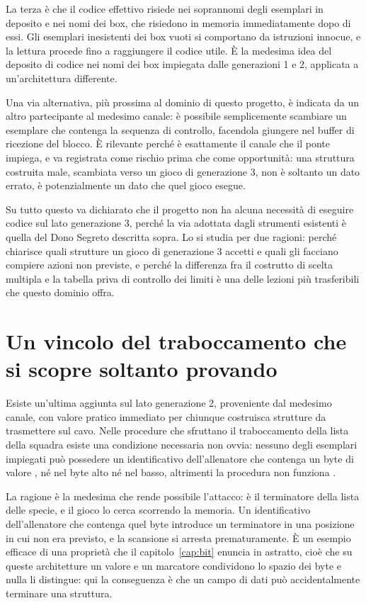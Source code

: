 La terza è che il codice effettivo risiede nei soprannomi degli esemplari in deposito e nei nomi dei box, che risiedono in memoria immediatamente dopo di essi. Gli esemplari inesistenti dei box vuoti si comportano da istruzioni innocue, e la lettura procede fino a raggiungere il codice utile. È la medesima idea del deposito di codice nei nomi dei box impiegata dalle generazioni 1 e 2, applicata a un'architettura differente.

Una via alternativa, più prossima al dominio di questo progetto, è indicata da un altro partecipante al medesimo canale: è possibile semplicemente scambiare un esemplare che contenga la sequenza di controllo, facendola giungere nel buffer di ricezione del blocco. È rilevante perché è esattamente il canale che il ponte impiega, e va registrata come rischio prima che come opportunità: una struttura costruita male, scambiata verso un gioco di generazione 3, non è soltanto un dato errato, è potenzialmente un dato che quel gioco esegue.

Su tutto questo va dichiarato che il progetto non ha alcuna necessità di eseguire codice sul lato generazione 3, perché la via adottata dagli strumenti esistenti è quella del Dono Segreto descritta sopra. Lo si studia per due ragioni: perché chiarisce quali strutture un gioco di generazione 3 accetti e quali gli facciano compiere azioni non previste, e perché la differenza fra il costrutto di scelta multipla e la tabella priva di controllo dei limiti è una delle lezioni più trasferibili che questo dominio offra.

\section{Un vincolo del traboccamento che si scopre soltanto provando}

Esiste un'ultima aggiunta sul lato generazione 2, proveniente dal medesimo canale, con valore pratico immediato per chiunque costruisca strutture da trasmettere sul cavo. Nelle procedure che sfruttano il traboccamento della lista della squadra esiste una condizione necessaria non ovvia: nessuno degli esemplari impiegati può possedere un identificativo dell'allenatore che contenga un byte di valore , né nel byte alto né nel basso, altrimenti la procedura non funziona \cite{gcri-discord}.

La ragione è la medesima che rende possibile l'attacco:  è il terminatore della lista delle specie, e il gioco lo cerca scorrendo la memoria. Un identificativo dell'allenatore che contenga quel byte introduce un terminatore in una posizione in cui non era previsto, e la scansione si arresta prematuramente. È un esempio efficace di una proprietà che il capitolo~\ref{cap:bit} enuncia in astratto, cioè che su queste architetture un valore e un marcatore condividono lo spazio dei byte e nulla li distingue: qui la conseguenza è che un campo di dati può accidentalmente terminare una struttura.

